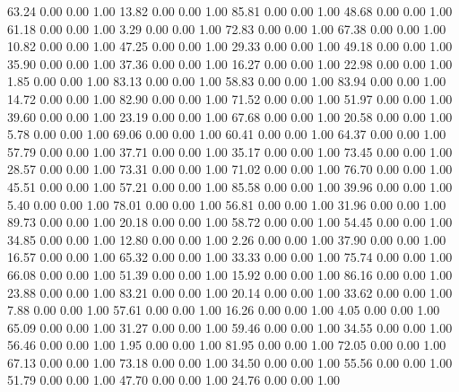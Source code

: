    63.24   0.00   0.00   1.00
   13.82   0.00   0.00   1.00
   85.81   0.00   0.00   1.00
   48.68   0.00   0.00   1.00
   61.18   0.00   0.00   1.00
    3.29   0.00   0.00   1.00
   72.83   0.00   0.00   1.00
   67.38   0.00   0.00   1.00
   10.82   0.00   0.00   1.00
   47.25   0.00   0.00   1.00
   29.33   0.00   0.00   1.00
   49.18   0.00   0.00   1.00
   35.90   0.00   0.00   1.00
   37.36   0.00   0.00   1.00
   16.27   0.00   0.00   1.00
   22.98   0.00   0.00   1.00
    1.85   0.00   0.00   1.00
   83.13   0.00   0.00   1.00
   58.83   0.00   0.00   1.00
   83.94   0.00   0.00   1.00
   14.72   0.00   0.00   1.00
   82.90   0.00   0.00   1.00
   71.52   0.00   0.00   1.00
   51.97   0.00   0.00   1.00
   39.60   0.00   0.00   1.00
   23.19   0.00   0.00   1.00
   67.68   0.00   0.00   1.00
   20.58   0.00   0.00   1.00
    5.78   0.00   0.00   1.00
   69.06   0.00   0.00   1.00
   60.41   0.00   0.00   1.00
   64.37   0.00   0.00   1.00
   57.79   0.00   0.00   1.00
   37.71   0.00   0.00   1.00
   35.17   0.00   0.00   1.00
   73.45   0.00   0.00   1.00
   28.57   0.00   0.00   1.00
   73.31   0.00   0.00   1.00
   71.02   0.00   0.00   1.00
   76.70   0.00   0.00   1.00
   45.51   0.00   0.00   1.00
   57.21   0.00   0.00   1.00
   85.58   0.00   0.00   1.00
   39.96   0.00   0.00   1.00
    5.40   0.00   0.00   1.00
   78.01   0.00   0.00   1.00
   56.81   0.00   0.00   1.00
   31.96   0.00   0.00   1.00
   89.73   0.00   0.00   1.00
   20.18   0.00   0.00   1.00
   58.72   0.00   0.00   1.00
   54.45   0.00   0.00   1.00
   34.85   0.00   0.00   1.00
   12.80   0.00   0.00   1.00
    2.26   0.00   0.00   1.00
   37.90   0.00   0.00   1.00
   16.57   0.00   0.00   1.00
   65.32   0.00   0.00   1.00
   33.33   0.00   0.00   1.00
   75.74   0.00   0.00   1.00
   66.08   0.00   0.00   1.00
   51.39   0.00   0.00   1.00
   15.92   0.00   0.00   1.00
   86.16   0.00   0.00   1.00
   23.88   0.00   0.00   1.00
   83.21   0.00   0.00   1.00
   20.14   0.00   0.00   1.00
   33.62   0.00   0.00   1.00
    7.88   0.00   0.00   1.00
   57.61   0.00   0.00   1.00
   16.26   0.00   0.00   1.00
    4.05   0.00   0.00   1.00
   65.09   0.00   0.00   1.00
   31.27   0.00   0.00   1.00
   59.46   0.00   0.00   1.00
   34.55   0.00   0.00   1.00
   56.46   0.00   0.00   1.00
    1.95   0.00   0.00   1.00
   81.95   0.00   0.00   1.00
   72.05   0.00   0.00   1.00
   67.13   0.00   0.00   1.00
   73.18   0.00   0.00   1.00
   34.50   0.00   0.00   1.00
   55.56   0.00   0.00   1.00
   51.79   0.00   0.00   1.00
   47.70   0.00   0.00   1.00
   24.76   0.00   0.00   1.00
